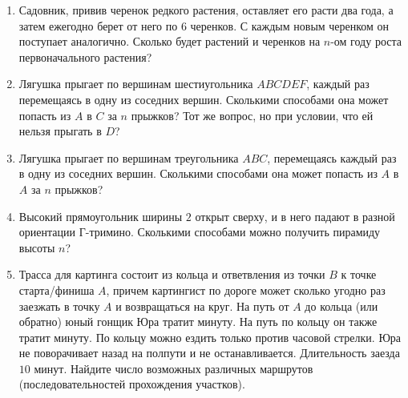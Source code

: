 \begin{enumerate}
\item Садовник, привив черенок редкого растения, оставляет его расти два года, а затем ежегодно берет от него по $6$ черенков. С каждым новым черенком он поступает аналогично. Сколько будет растений и черенков на $n$-ом году роста первоначального растения? 

\item Лягушка прыгает по вершинам шестиугольника $ABCDEF$, каждый раз перемещаясь в одну из соседних вершин. Сколькими способами она может попасть из $A$ в $C$ за $n$ прыжков? Тот же вопрос, но при условии, что ей нельзя прыгать в $D$? 

\item Лягушка прыгает по вершинам треугольника $ABC$, перемещаясь каждый раз в одну из соседних вершин. Сколькими способами она может попасть из $A$ в $A$ за $n$ прыжков?

\item Высокий прямоугольник ширины $2$ открыт сверху, и в него падают в разной ориентации Г-тримино.
  Сколькими способами можно получить пирамиду высоты $n$?

\item Трасса для картинга состоит из кольца и ответвления из точки $B$ к точке старта/финиша $A$,
 причем картингист по дороге может сколько угодно раз заезжать в точку $A$ и возвращаться на круг.
 На путь от $A$ до кольца (или обратно) юный гонщик Юра тратит минуту. На путь по кольцу он также
 тратит минуту. По кольцу можно ездить только против часовой стрелки. Юра не поворачивает назад на полпути и не останавливается. Длительность заезда $10$ минут. Найдите число возможных различных маршрутов (последовательностей прохождения участков).


\end{enumerate}
